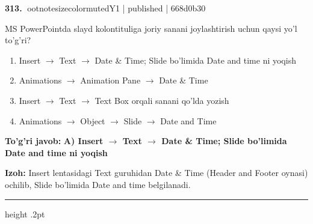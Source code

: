 \documentclass[10pt,a4paper]{article}
\begin{document}
\textbf{\color{ink}313.} {ootnotesizecolor{muted}Y1 | published | 668d0b30}
\par
MS PowerPointda slayd kolontituliga joriy sanani joylashtirish uchun qaysi yo'l to'g'ri?
\begin{enumerate}[label=\Alph*),leftmargin=9mm]
\item Insert \ensuremath{\rightarrow} Text \ensuremath{\rightarrow} Date \& Time; Slide bo'limida Date and time ni yoqish
\item Animations \ensuremath{\rightarrow} Animation Pane \ensuremath{\rightarrow} Date \& Time
\item Insert \ensuremath{\rightarrow} Text \ensuremath{\rightarrow} Text Box orqali sanani qo'lda yozish
\item Animations \ensuremath{\rightarrow} Object \ensuremath{\rightarrow} Slide \ensuremath{\rightarrow} Date and Time
\end{enumerate}
\begin{tcolorbox}[enhanced,breakable,colback=teal!4,colframe=teal!55!black,boxrule=0.45pt,arc=1.2mm,left=2.8mm,right=2.8mm,top=2mm,bottom=2mm]
\textbf{\color{teal}To'g'ri javob:} \textbf{A) Insert \ensuremath{\rightarrow} Text \ensuremath{\rightarrow} Date \& Time; Slide bo'limida Date and time ni yoqish}
\par\smallskip
\textbf{Izoh:} Insert lentasidagi Text guruhidan Date \& Time (Header and Footer oynasi) ochilib, Slide bo'limida Date and time belgilanadi.
\end{tcolorbox}
\vspace{2mm}\hrule height .2pt\vspace{2mm}
\end{document}
